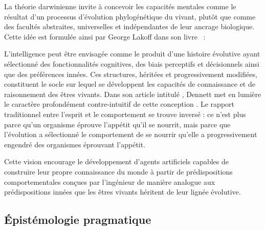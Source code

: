 La théorie darwinienne invite à concevoir les capacités mentales comme le résultat d’un processus d’évolution phylogénétique du vivant, plutôt que comme des facultés abstraites, universelles et indépendantes de leur ancrage biologique.
Cette idée est formulée ainsi par George Lakoff dans son livre \og {} \fg\ :

\begin{quote}
\cite[p.~4]{lakoff_philosophy_1999}
\end{quote}

L'intelligence peut être envisagée comme le produit d'une histoire évolutive ayant sélectionné des fonctionnalités cognitives, des biais perceptifs et décisionnels ainsi que des préférences innées.  
Ces structures, héritées et progressivement modifiées, constituent le socle sur lequel se développent les capacités de connaissance et de raisonnement des êtres vivants.
Dans son article intitulé \og {} \fg, Dennett met en lumière le caractère profondément contre-intuitif de cette conception
\cite{dennett_darwins_2009}. 
Le rapport traditionnel entre l'esprit et le comportement se trouve inversé : ce n'est plus parce qu'un organisme éprouve l'appétit qu'il se nourrit, mais parce que l'évolution a sélectionné le comportement de se nourrir qu'elle a progressivement engendré des organismes éprouvant l'appétit. 

Cette vision encourage le développement d’agents artificiels capables de construire leur propre connaissance du monde à partir de prédispositions comportementales conçues par l'ingénieur de manière analogue aux prédispositions innées que les êtres vivants héritent de leur lignée évolutive.


\subsection{Épistémologie pragmatique}
\label{sec:pragmatisme}

